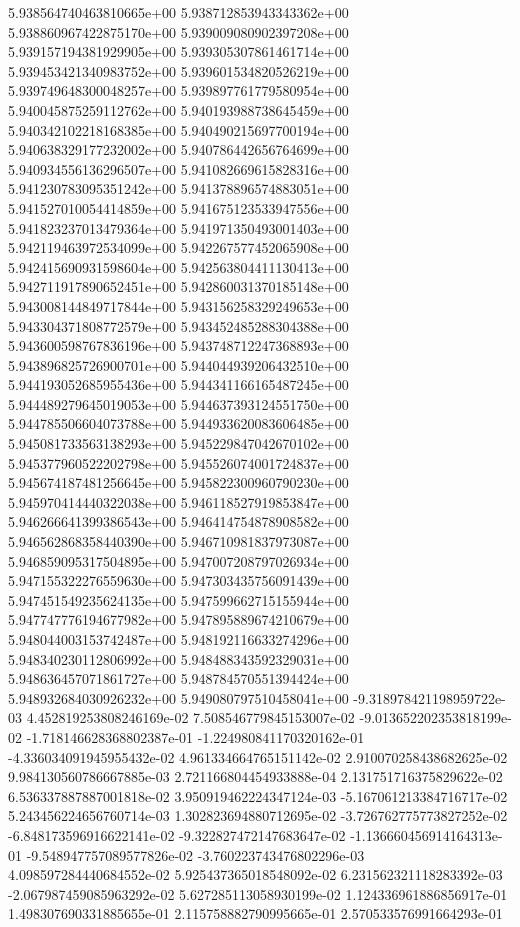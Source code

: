 5.938564740463810665e+00
5.938712853943343362e+00
5.938860967422875170e+00
5.939009080902397208e+00
5.939157194381929905e+00
5.939305307861461714e+00
5.939453421340983752e+00
5.939601534820526219e+00
5.939749648300048257e+00
5.939897761779580954e+00
5.940045875259112762e+00
5.940193988738645459e+00
5.940342102218168385e+00
5.940490215697700194e+00
5.940638329177232002e+00
5.940786442656764699e+00
5.940934556136296507e+00
5.941082669615828316e+00
5.941230783095351242e+00
5.941378896574883051e+00
5.941527010054414859e+00
5.941675123533947556e+00
5.941823237013479364e+00
5.941971350493001403e+00
5.942119463972534099e+00
5.942267577452065908e+00
5.942415690931598604e+00
5.942563804411130413e+00
5.942711917890652451e+00
5.942860031370185148e+00
5.943008144849717844e+00
5.943156258329249653e+00
5.943304371808772579e+00
5.943452485288304388e+00
5.943600598767836196e+00
5.943748712247368893e+00
5.943896825726900701e+00
5.944044939206432510e+00
5.944193052685955436e+00
5.944341166165487245e+00
5.944489279645019053e+00
5.944637393124551750e+00
5.944785506604073788e+00
5.944933620083606485e+00
5.945081733563138293e+00
5.945229847042670102e+00
5.945377960522202798e+00
5.945526074001724837e+00
5.945674187481256645e+00
5.945822300960790230e+00
5.945970414440322038e+00
5.946118527919853847e+00
5.946266641399386543e+00
5.946414754878908582e+00
5.946562868358440390e+00
5.946710981837973087e+00
5.946859095317504895e+00
5.947007208797026934e+00
5.947155322276559630e+00
5.947303435756091439e+00
5.947451549235624135e+00
5.947599662715155944e+00
5.947747776194677982e+00
5.947895889674210679e+00
5.948044003153742487e+00
5.948192116633274296e+00
5.948340230112806992e+00
5.948488343592329031e+00
5.948636457071861727e+00
5.948784570551394424e+00
5.948932684030926232e+00
5.949080797510458041e+00
-9.318978421198959722e-03
4.452819253808246169e-02
7.508546779845153007e-02
-9.013652202353818199e-02
-1.718146628368802387e-01
-1.224980841170320162e-01
-4.336034091945955432e-02
4.961334664765151142e-02
2.910070258438682625e-02
9.984130560786667885e-03
2.721166804454933888e-04
2.131751716375829622e-02
6.536337887887001818e-02
3.950919462224347124e-03
-5.167061213384716717e-02
5.243456224656760714e-03
1.302823694880712695e-02
-3.726762775773827252e-02
-6.848173596916622141e-02
-9.322827472147683647e-02
-1.136660456914164313e-01
-9.548947757089577826e-02
-3.760223743476802296e-03
4.098597284440684552e-02
5.925437365018548092e-02
6.231562321118283392e-03
-2.067987459085963292e-02
5.627285113058930199e-02
1.124336961886856917e-01
1.498307690331885655e-01
2.115758882790995665e-01
2.570533576991664293e-01
